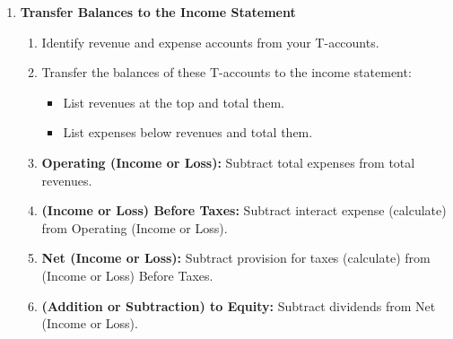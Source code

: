 \begin{process}
\begin{enumerate}
        \item \textbf{Transfer Balances to the Income Statement}
        \begin{enumerate}
            \item Identify revenue and expense accounts from your T-accounts.
            \item Transfer the balances of these T-accounts to the income statement:
            \begin{itemize}
                \item List revenues at the top and total them.
                \item List expenses below revenues and total them.
            \end{itemize}
            \item \textbf{Operating (Income or Loss):} Subtract total expenses from total revenues.
            \item \textbf{(Income or Loss) Before Taxes:} Subtract interact expense (calculate) from Operating (Income or Loss).
            \item \textbf{Net (Income or Loss):} Subtract provision for taxes (calculate) from (Income or Loss) Before Taxes.
            \item \textbf{(Addition or Subtraction) to Equity:} Subtract dividends from Net (Income or Loss).
        \end{enumerate}
    

\end{enumerate}
\end{process}
